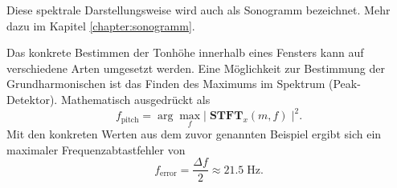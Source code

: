 Diese spektrale Darstellungsweise wird auch als Sonogramm bezeichnet.
Mehr dazu im Kapitel \ref{chapter:sonogramm}.

Das konkrete Bestimmen der Tonhöhe innerhalb eines Fensters kann auf verschiedene Arten umgesetzt werden.
Eine Möglichkeit zur Bestimmung der Grundharmonischen ist das Finden des Maximums im Spektrum (Peak-Detektor).
Mathematisch ausgedrückt als
\begin{equation}
    f_{\text{pitch}}
    =
    \arg\max_f \left| \; \mathbf{STFT}_x(m, f) \; \right|^2.
\end{equation}
Mit den konkreten Werten aus dem zuvor genannten Beispiel ergibt sich ein maximaler Frequenzabtastfehler von
\begin{equation}
    f_{\text{error}}
    =
    \frac{\Delta f}{2}
    \approx
    21.5\;\text{Hz}.
\end{equation}


